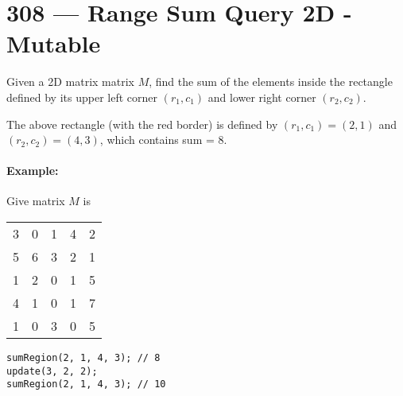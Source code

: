 \section{308 --- Range Sum Query 2D - Mutable}
Given a 2D matrix matrix $M$, find the sum of the elements inside the rectangle defined by its upper left corner $(r_1, c_1)$ and lower right corner $(r_2, c_2)$.
\begin{figure}[H]
\end{figure}
The above rectangle (with the red border) is defined by $(r_1, c_1) = (2, 1)$ and $(r_2, c_2) = (4, 3)$, which contains sum = 8.
\paragraph{Example:}
\begin{flushleft}
Give matrix $M$ is
\begin{table}[H]
    \begin{tabular}{ccccc}
        3 & 0 & 1 & 4 & 2 \\
        5 &  6 &  3 &  2 &  1\\
        1 &  2 &  0 &  1 &  5 \\
        4 &  1 &  0 &  1 &  7\\
        1 &  0 &  3 &  0 &  5
    \end{tabular}
\end{table}
\begin{lstlisting}[style=customc]
sumRegion(2, 1, 4, 3); // 8
update(3, 2, 2);
sumRegion(2, 1, 4, 3); // 10
\end{lstlisting}
\end{flushleft}

